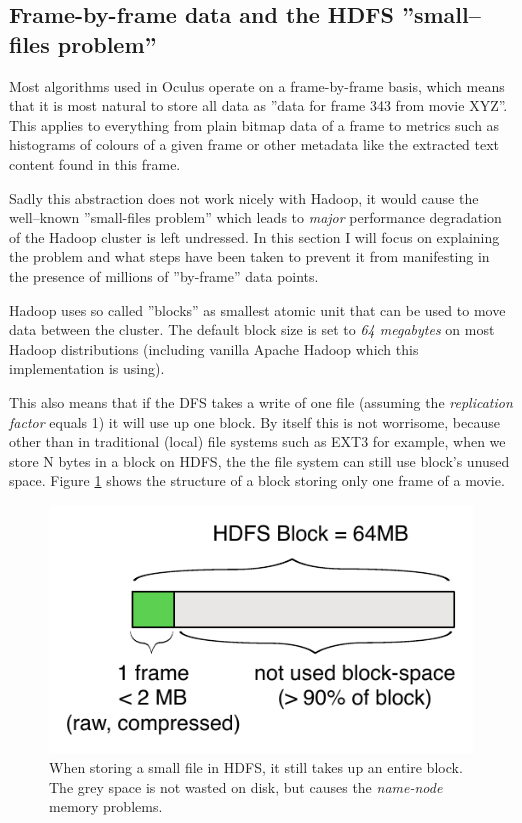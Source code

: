 \subsection{Frame-by-frame data and the HDFS ''small--files problem''}
\label{sec:sequence-files}
Most algorithms used in Oculus operate on a frame-by-frame basis, which means that it is most natural to store all data as ''data for frame 343 from movie XYZ''.
This applies to everything from plain bitmap data of a frame to metrics such as histograms of colours of a given frame or other metadata like the extracted text content found in this frame.

Sadly this abstraction does not work nicely with Hadoop, it would cause the well--known ''small-files problem'' which leads to \textit{major} performance degradation of the Hadoop cluster is left undressed. In this section I will focus on explaining the problem and what steps have been taken to prevent it from manifesting in the presence of millions of ''by-frame'' data points.

Hadoop uses so called ''blocks'' as smallest atomic unit that can be used to move data between the cluster.
The default block size is set to \textit{64 megabytes} on most Hadoop distributions (including vanilla Apache Hadoop which this implementation is using).

This also means that if the DFS takes a write of one file (assuming the \textit{replication factor} equals 1) it will use up one block.
By itself this is not worrisome, because other than in traditional (local) file systems such as EXT3 for example, when we store N bytes in a block on HDFS,
the the file system can still use block's unused space. Figure \ref{fig:no-sequence-file} shows the structure of a block storing only one frame of a movie.

\begin{figure}[ch!]
  \centering
  \includegraphics[scale=0.9]{diagrams/no-sequence-file.pdf}
  \caption{When storing a small file in HDFS, it still takes up an entire block. The grey space is not wasted on disk, but causes the \textit{name-node} memory problems.}
  \label{fig:no-sequence-file}
\end{figure}

